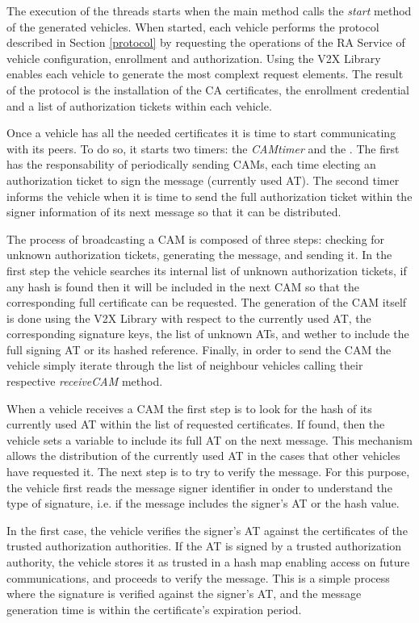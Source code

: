 The execution of the threads starts when the main method calls the \textit{start} method of the generated vehicles. When started, each vehicle performs the protocol described in Section \ref{protocol} by requesting the operations of the RA Service of vehicle configuration, enrollment and authorization. Using the V2X Library enables each vehicle to generate the most complext request elements. The result of the protocol is the installation of the CA certificates, the enrollment credential and a list of authorization tickets within each vehicle. 

Once a vehicle has all the needed certificates it is time to start communicating with its peers. To do so, it starts two timers: the \textit{CAMtimer} and the . The first has the responsability of periodically sending CAMs, each time electing an authorization ticket to sign the message (currently used AT). The second timer informs the vehicle when it is time to send the full authorization ticket within the signer information of its next message so that it can be distributed. 

The process of broadcasting a CAM is composed of three steps: checking for unknown authorization tickets, generating the message, and sending it. In the first step the vehicle searches its internal list of unknown authorization tickets, if any hash is found then it will be included in the next CAM so that the corresponding full certificate can be requested. The generation of the CAM itself is done using the V2X Library with respect to the currently used AT, the corresponding signature keys, the list of unknown ATs, and wether to include the full signing AT or its hashed reference. Finally, in order to send the CAM the vehicle simply iterate through the list of neighbour vehicles calling their respective \textit{receiveCAM} method.
 
When a vehicle receives a CAM the first step is to look for the hash of its currently used AT within the list of requested certificates. If found, then the vehicle sets a variable to include its full AT on the next message. This mechanism allows the distribution of the currently used AT in the cases that other vehicles have requested it.
The next step is to try to verify the message. For this purpose, the vehicle first reads the message signer identifier in onder to understand the type of signature, i.e. if the message includes the signer's AT or the hash value. 

In the first case, the vehicle verifies the signer's AT against the certificates of the trusted authorization authorities. If the AT is signed by a trusted authorization authority, the vehicle stores it as trusted in a hash map enabling access on future communications, and proceeds to verify the message. This is a simple process where the signature is verified against the signer's AT, and the message generation time is within the certificate's expiration period.

